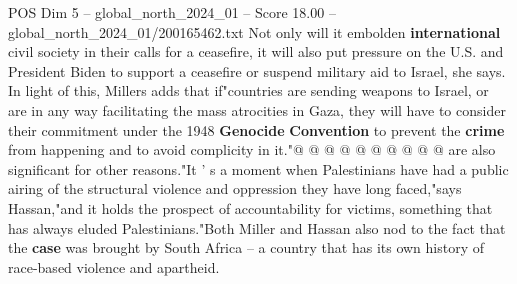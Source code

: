 \begin{textsample}{POS Dim 5 – global\_north\_2024\_01 – Score 18.00 – global\_north\_2024\_01/200165462.txt}
Not only will it embolden \textbf{international} civil society in their calls for a ceasefire, it will also put pressure on the U.S. and President Biden to support a ceasefire or suspend military aid to Israel, she says.
In light of this, Millers adds that if"countries are sending weapons to Israel, or are in any way facilitating the mass atrocities in Gaza, they will have to consider their commitment under the 1948 \textbf{Genocide} \textbf{Convention} to prevent the \textbf{crime} from happening and to avoid complicity in it."@ @ @ @ @ @ @ @ @ @ are also significant for other reasons."It ' s a moment when Palestinians have had a public airing of the structural violence and oppression they have long faced,"says Hassan,"and it holds the prospect of accountability for victims, something that has always eluded Palestinians."Both Miller and Hassan also nod to the fact that the \textbf{case} was brought by South Africa -- a country that has its own history of race-based violence and apartheid.

\end{textsample}
